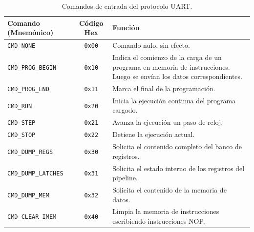 \begin{table}[h]
\centering
\begin{tabular}{|l|c|p{8.5cm}|}
\hline
\textbf{Comando (Mnemónico)} & \textbf{Código Hex} & \textbf{Función} \\ \hline
\texttt{CMD\_NONE} & \texttt{0x00} & Comando nulo, sin efecto. \\ \hline
\texttt{CMD\_PROG\_BEGIN} & \texttt{0x10} & Indica el comienzo de la carga de un programa en memoria de instrucciones. Luego se envían los datos correspondientes. \\ \hline
\texttt{CMD\_PROG\_END} & \texttt{0x11} & Marca el final de la programación. \\ \hline
\texttt{CMD\_RUN} & \texttt{0x20} & Inicia la ejecución continua del programa cargado. \\ \hline
\texttt{CMD\_STEP} & \texttt{0x21} & Avanza la ejecución un paso de reloj. \\ \hline
\texttt{CMD\_STOP} & \texttt{0x22} & Detiene la ejecución actual. \\ \hline
\texttt{CMD\_DUMP\_REGS} & \texttt{0x30} & Solicita el contenido completo del banco de registros. \\ \hline
\texttt{CMD\_DUMP\_LATCHES} & \texttt{0x31} & Solicita el estado interno de los registros del pipeline. \\ \hline
\texttt{CMD\_DUMP\_MEM} & \texttt{0x32} & Solicita el contenido de la memoria de datos. \\ \hline
\texttt{CMD\_CLEAR\_IMEM} & \texttt{0x40} & Limpia la memoria de instrucciones escribiendo instrucciones NOP. \\ \hline
\end{tabular}
\caption{Comandos de entrada del protocolo UART.}
\end{table}

